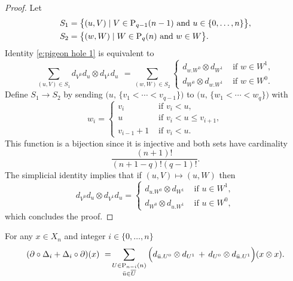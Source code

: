 \begin{proof}
	Let
	\begin{align*}
	& S_1 = \big\{ (u, V)\mid V \in \P_{q-1}(n-1) \text{ and } u \in \{0,\dots,n\} \big\}, \\
	& S_2 = \big\{ (w, W)\mid W \in \P_{q}(n) \text{ and } w \in W \big\}.
	\end{align*}
	Identity \eqref{e:pigeon hole 1} is equivalent to
	\begin{equation} \label{e:pigeon hole 2}
	\sum_{(u, V) \in S_1} d_{V^0}d_u \otimes d_{V^1}d_u \ \, = \!
	\sum_{(w, W) \in S_2} 
	\begin{cases}
	d_{w.W^0} \otimes d_{W^1} & \text{ if } w \in W^1, \\
	d_{W^0} \otimes d_{w.W^1} & \text{ if } w \in W^0.
	\end{cases}
	\end{equation}	
	Define $S_1 \to S_2$ by sending $\big(u,\, \{v_1 < \cdots < v_{q-1}\} \big)$ to $\big(u,\, \{w_1 < \cdots < w_{q}\} \big)$ with
	\begin{equation*}
	w_i = 
	\begin{cases}
	v_i & \text{ if } v_i < u, \\
	u & \text{ if } v_i < u \leq v_{i+1}, \\
	v_{i-1}+1 & \text{ if } v_i < u.
	\end{cases}
	\end{equation*} 
	This function is a bijection since it is injective and both sets have cardinality 
	\begin{equation*}
	\frac{(n+1)!}{(n+1-q)!(q-1)!}.
	\end{equation*}
	The simplicial identity implies that if $(u, V) \mapsto (u, W)$ then
	\begin{equation*}
	d_{V^0}d_u \otimes d_{V^1}d_u =
	\begin{cases}
	d_{u.W^0} \otimes d_{W^1} & \text{ if } u \in W^1, \\
	d_{W^0} \otimes d_{u.W^1} & \text{ if } u \in W^0,
	\end{cases}
	\end{equation*}
	which concludes the proof.
\end{proof}

\begin{lemma} \label{l:boundary of Delta}
	For any $x \in X_n$ and integer $i \in \{0, \dots, n\}$
	\begin{equation} \label{e:boundary of Delta}
	(\partial \circ \Delta_i + \Delta_i \circ \partial)(x) \ = \! 
	\sum_{\substack{U \in \P_{n-i}(n) \\ \bu \in \overline{U}}} \Big( d_{\bu.U^0} \otimes d_{U^1} \, + \, d_{U^0} \otimes d_{\bu.U^1} \Big) (x \otimes x).
	\end{equation}
\end{lemma}

